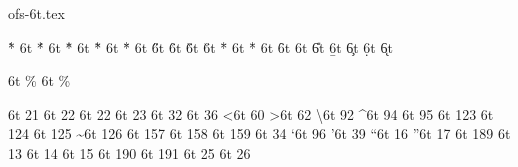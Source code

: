 
 
\protectreading ofs-6t.tex %

\accentdef  \` *    6t  {}
\accentdef  \' *    6t  {}
\accentdef  \^ *    6t  {}
\accentdef  \~ *    6t  {}
\accentdef  \" *    6t  {}
\accentdef  \H *    6t  {}
\accentdef  \r *    6t  {}
\accentdef  \v *    6t  {}
\accentdef  \u *    6t  {}
\accentdef  \= *    6t  {}
\accentdef  \. *    6t  {}
\accentdef  \f *    6t  {}
\accentdef  \C *    6t  {}
\accentdef  \U *    6t  {}
\accentdef  \b *    6t  {}
\accentdef  \c *    6t  {}
\accentdef  \d *    6t  {}
\accentdef  \k *    6t  {}

\let\promile=\relax
\characterdef \promile          6t {\% }        
\characterdef \pertenthousand   6t {\% } 

\characterdef \textendash         6t   21
\characterdef \cyrdash            6t   22
\characterdef \textemdash         6t   22
\characterdef \textcompwordmark   6t   23
\characterdef \textvisiblespace   6t   32
\characterdef \textdollar         6t   36
\characterdef \textless           6t   60
\characterdef \textgreater        6t   62
\characterdef \textbackslash      6t   92
\characterdef \textasciicircum    6t   94
\characterdef \textunderscore     6t   95
\characterdef \textbraceleft      6t   123
\characterdef \textbar            6t   124
\characterdef \textbraceright     6t   125
\characterdef \textasciitilde     6t   126
\characterdef \textnumero         6t   157
\characterdef \textcurrency       6t   158
\characterdef \textsection        6t   159
\characterdef \textquotedbl       6t   34
\characterdef \textquoteleft      6t   96
\characterdef \textquoteright     6t   39
\characterdef \textquotedblleft   6t   16
\characterdef \textquotedblright  6t   17
\characterdef \quotedblbase       6t   189
\characterdef \CYRpalochka        6t   13
\characterdef \cyrlangle          6t   14
\characterdef \cyrrangle          6t   15
\characterdef \guillemotleft      6t   190
\characterdef \guillemotright     6t   191
\characterdef \dotlessi           6t   25
\characterdef \dotlessj           6t   26


